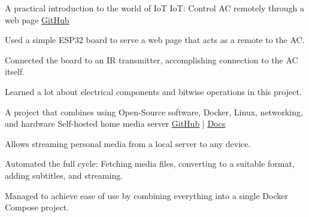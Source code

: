 

\begin{cventries}
  
  \cventry
    {A practical introduction to the world of IoT} %
    {IoT: Control AC remotely through a web page} %
    {\underline{\href{https://github.com/ordabool/ac_remote_esp32}{GitHub}}} %
    {} %
    {
      \begin{cvitems} %
        \item {Used a simple ESP32 board to serve a web page that acts as a remote to the AC.}
        \item {Connected the board to an IR transmitter, accomplishing connection to the AC itself.}
        \item {Learned a lot about electrical components and bitwise operations in this project.}
      \end{cvitems}
    }
    
  \cventry
    {A project that combines using Open-Source software, Docker, Linux, networking, and hardware} %
    {Self-hosted home media server} %
    {\underline{\href{https://github.com/ordabool/MediaServer}{GitHub}} | \underline{\href{https://docs.jellybeb.com/pages/general/overview.html}{Docs}}} %
    {} %
    {
      \begin{cvitems} %
        \item {Allows streaming personal media from a local server to any device.}
        \item {Automated the full cycle: Fetching media files, converting to a suitable format, adding subtitles, and streaming.}
        \item {Managed to achieve ease of use by combining everything into a single Docker Compose project.}
      \end{cvitems}
    }



\end{cventries}
